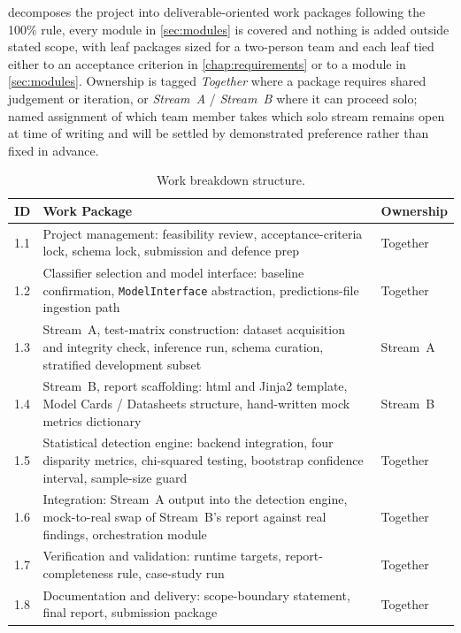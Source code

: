  decomposes the project into deliverable-oriented work packages following the 100\% rule, every module in \cref{sec:modules} is covered and nothing is added outside stated scope, with leaf packages sized for a two-person team and each leaf tied either to an acceptance criterion in \cref{chap:requirements} or to a module in \cref{sec:modules}. Ownership is tagged \emph{Together} where a package requires shared judgement or iteration, or \emph{Stream~A} / \emph{Stream~B} where it can proceed solo; named assignment of which team member takes which solo stream remains open at time of writing and will be settled by demonstrated preference rather than fixed in advance.

\begin{table}[htbp]
    \centering
    \renewcommand{\arraystretch}{1.3}
    \caption{Work breakdown structure.}
    \label{tab:wbs}
    \begin{tabular}{p{0.9cm}p{6.4cm}p{2.2cm}}
        \toprule
        \textbf{ID} & \textbf{Work Package} & \textbf{Ownership} \\
        \midrule
        1.1 & Project management: feasibility review, acceptance-criteria lock, schema lock, submission and defence prep & Together \\
        1.2 & Classifier selection and model interface: baseline confirmation, \texttt{ModelInterface} abstraction, predictions-file ingestion path & Together \\
        1.3 & Stream~A, test-matrix construction: dataset acquisition and integrity check, inference run, schema curation, stratified development subset & Stream~A \\
        1.4 & Stream~B, report scaffolding: \gls{html} and Jinja2 template, Model Cards / Datasheets structure, hand-written mock metrics dictionary & Stream~B \\
        1.5 & Statistical detection engine: backend integration, four disparity metrics, chi-squared testing, bootstrap confidence interval, sample-size guard & Together \\
        1.6 & Integration: Stream~A output into the detection engine, mock-to-real swap of Stream~B's report against real findings, orchestration module & Together \\
        1.7 & Verification and validation: runtime targets, report-completeness rule, case-study run & Together \\
        1.8 & Documentation and delivery: scope-boundary statement, final report, submission package & Together \\
        \bottomrule
    \end{tabular}
\end{table}

